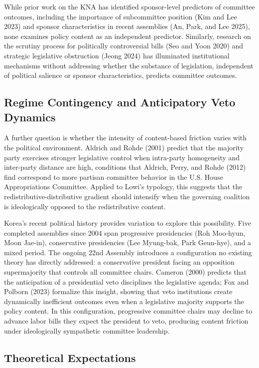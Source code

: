 \documentclass[11pt]{article}
\begin{document}
While prior work on the KNA has identified sponsor-level predictors of committee outcomes, including the importance of subcommittee position (Kim and Lee 2023) and sponsor characteristics in recent assemblies (An, Park, and Lee 2025), none examines policy content as an independent predictor. Similarly, research on the scrutiny process for politically controversial bills (Seo and Yoon 2020) and strategic legislative obstruction (Jeong 2024) has illuminated institutional mechanisms without addressing whether the substance of legislation, independent of political salience or sponsor characteristics, predicts committee outcomes.

\subsection{Regime Contingency and Anticipatory Veto Dynamics}
\label{sec:regime}

A further question is whether the intensity of content-based friction varies with the political environment. Aldrich and Rohde (2001) predict that the majority party exercises stronger legislative control when intra-party homogeneity and inter-party distance are high, conditions that Aldrich, Perry, and Rohde (2012) find correspond to more partisan committee behavior in the U.S. House Appropriations Committee. Applied to Lowi's typology, this suggests that the redistributive-distributive gradient should intensify when the governing coalition is ideologically opposed to the redistributive content.

Korea's recent political history provides variation to explore this possibility. Five completed assemblies since 2004 span progressive presidencies (Roh Moo-hyun, Moon Jae-in), conservative presidencies (Lee Myung-bak, Park Geun-hye), and a mixed period. The ongoing 22nd Assembly introduces a configuration no existing theory has directly addressed: a conservative president facing an opposition supermajority that controls all committee chairs. Cameron (2000) predicts that the anticipation of a presidential veto disciplines the legislative agenda; Fox and Polborn (2023) formalize this insight, showing that veto institutions create dynamically inefficient outcomes even when a legislative majority supports the policy content. In this configuration, progressive committee chairs may decline to advance labor bills they expect the president to veto, producing content friction under ideologically sympathetic committee leadership.

\subsection{Theoretical Expectations}
\end{document}
